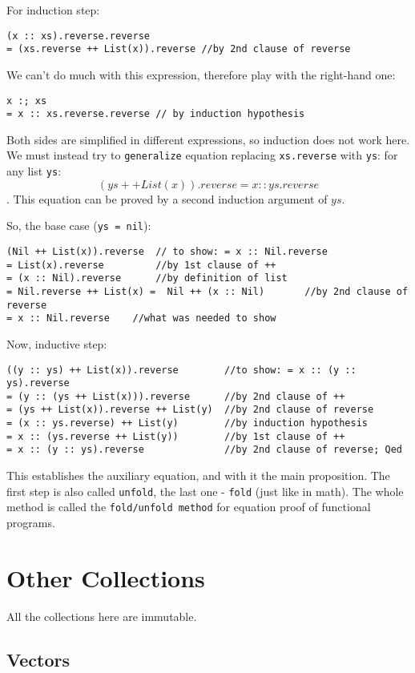 \documentclass{scrartcl}
\newcommand{\term}[1]{\verb~#1~} %
\begin{document}
For induction step:
\begin{lstlisting}
(x :: xs).reverse.reverse
= (xs.reverse ++ List(x)).reverse //by 2nd clause of reverse
\end{lstlisting}
We can't do much with this expression, therefore play with the right-hand one: 
\begin{lstlisting}
x :; xs
= x :: xs.reverse.reverse // by induction hypothesis
\end{lstlisting}

Both sides are simplified in different expressions, so induction does not work
here. We must instead try to \term{generalize} equation replacing
\lstinline|xs.reverse| with \lstinline|ys|: for any list \lstinline|ys|:
$$(ys ++ List(x)).reverse = x :: ys.reverse$$. This equation can be proved by a
second induction argument of $ys$. 

So, the base case (\lstinline|ys = nil|):
\begin{lstlisting}
(Nil ++ List(x)).reverse  // to show: = x :: Nil.reverse
= List(x).reverse         //by 1st clause of ++
= (x :: Nil).reverse      //by definition of list
= Nil.reverse ++ List(x) =  Nil ++ (x :: Nil)       //by 2nd clause of reverse
= x :: Nil.reverse    //what was needed to show
\end{lstlisting}

Now, inductive step:
\begin{lstlisting}
((y :: ys) ++ List(x)).reverse        //to show: = x :: (y :: ys).reverse
= (y :: (ys ++ List(x))).reverse      //by 2nd clause of ++
= (ys ++ List(x)).reverse ++ List(y)  //by 2nd clause of reverse
= (x :: ys.reverse) ++ List(y)        //by induction hypothesis
= x :: (ys.reverse ++ List(y))        //by 1st clause of ++
= x :: (y :: ys).reverse              //by 2nd clause of reverse; Qed
\end{lstlisting}
This establishes the auxiliary equation, and with it the main proposition.
The first step is also called \term{unfold}, the last one - \term{fold} (just
like in math). The whole method is called the \term{fold/unfold method} for
equation proof of functional programs.

\section{Other Collections}
\label{sec:OtherCollections}
All the collections here are immutable. 

\subsection{Vectors}
\label{sec:Vectors}
\end{document}
